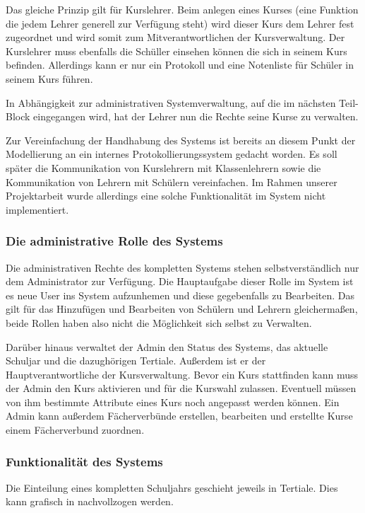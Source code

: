 \documentclass[12pt, twoside, a4paper, ngerman]{article}
\begin{document}
Das gleiche Prinzip gilt für Kurslehrer. 
Beim anlegen eines Kurses (eine Funktion die jedem Lehrer generell zur Verfügung steht) wird dieser Kurs dem Lehrer fest zugeordnet und wird somit zum Mitverantwortlichen der Kursverwaltung. 
Der Kurslehrer muss ebenfalls die Schüller einsehen können die sich in seinem Kurs befinden. Allerdings kann er nur ein Protokoll und eine Notenliste für Schüler in seinem Kurs führen.

In Abhängigkeit zur administrativen Systemverwaltung, auf die im nächsten Teil-Block eingegangen wird, hat der Lehrer nun die Rechte seine Kurse zu verwalten.

Zur Vereinfachung der Handhabung des Systems ist bereits an diesem Punkt der Modellierung an ein internes Protokollierungssystem gedacht worden. 
Es soll später die Kommunikation von Kurslehrern mit Klassenlehrern sowie die Kommunikation von Lehrern mit Schülern vereinfachen.
Im Rahmen unserer Projektarbeit wurde allerdings eine solche Funktionalität im System nicht implementiert.

\subsubsection{Die administrative Rolle des Systems}

Die administrativen Rechte des kompletten Systems stehen selbstverständlich nur dem Administrator zur Verfügung. Die Hauptaufgabe dieser Rolle im System ist es neue User ins System aufzunhemen und diese gegebenfalls zu Bearbeiten.
Das gilt für das Hinzufügen und Bearbeiten von Schülern und Lehrern gleichermaßen, beide Rollen haben also nicht die Möglichkeit sich selbst zu Verwalten.

Darüber hinaus verwaltet der Admin den Status des Systems, das aktuelle Schuljar und die dazughörigen Tertiale. Außerdem ist er der Hauptverantwortliche der Kursverwaltung.
Bevor ein Kurs stattfinden kann muss der Admin den Kurs aktivieren und für die Kurswahl zulassen. Eventuell müssen von ihm bestimmte Attribute eines Kurs noch angepasst werden können.
Ein Admin kann außerdem Fächerverbünde erstellen, bearbeiten und erstellte Kurse einem Fächerverbund zuordnen.

\subsubsection{Funktionalität des Systems}

Die Einteilung eines kompletten Schuljahrs geschieht jeweils in Tertiale. Dies kann grafisch in  nachvollzogen werden. 
\end{document}
